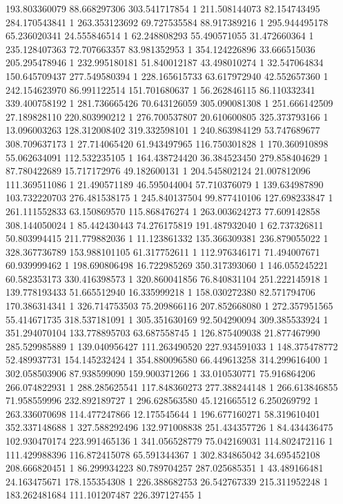 193.803360079	88.668297306	303.541717854	1
211.508144073	82.154743495	284.170543841	1
263.353123692	69.727535584	88.917389216	1
295.944495178	65.236020341	24.555846514	1
62.248808293	55.490571055	31.472660364	1
235.128407363	72.707663357	83.981352953	1
354.124226896	33.666515036	205.295478946	1
232.995180181	51.840012187	43.498010274	1
32.547064834	150.645709437	277.549580394	1
228.165615733	63.617972940	42.552657360	1
242.154623970	86.991122514	151.701680637	1
56.262846115	86.110332341	339.400758192	1
281.736665426	70.643126059	305.090081308	1
251.666142509	27.189828110	220.803990212	1
276.700537807	20.610600805	325.373793166	1
13.096003263	128.312008402	319.332598101	1
240.863984129	53.747689677	308.709637173	1
27.714065420	61.943497965	116.750301828	1
170.360910898	55.062634091	112.532235105	1
164.438724420	36.384523450	279.858404629	1
87.780422689	15.717172976	49.182600131	1
204.545802124	21.007812096	111.369511086	1
21.490571189	46.595044004	57.710376079	1
139.634987890	103.732220703	276.481538175	1
245.840137504	99.877410106	127.698233847	1
261.111552833	63.150869570	115.868476274	1
263.003624273	77.609142858	308.144050024	1
85.442430443	74.276175819	191.487932040	1
62.737326811	50.803994415	211.779882036	1
11.123861332	135.366309381	236.879055022	1
328.367736789	153.988101105	61.317752611	1
112.976346171	71.494007671	60.939999462	1
198.690806498	16.722985269	350.317393060	1
146.055245221	60.582353173	330.416398573	1
320.860041856	76.840831104	251.222145918	1
139.778193433	51.665512940	16.335999218	1
158.030272380	82.571794706	170.386314341	1
326.714753503	75.209866116	207.852668080	1
272.357951565	55.414671735	318.537181091	1
305.351630169	92.504290094	309.385533924	1
351.294070104	133.778895703	63.687558745	1
126.875409038	21.877467990	285.529985889	1
139.040956427	111.263490520	227.934591033	1
148.375478772	52.489937731	154.145232424	1
354.880096580	66.449613258	314.299616400	1
302.058503906	87.938599090	159.900371266	1
33.010530771	75.916864206	266.074822931	1
288.285625541	117.848360273	277.388244148	1
266.613846855	71.958559996	232.892189727	1
296.628563580	45.121665512	6.250269792	1
263.336070698	114.477247866	12.175545644	1
196.677160271	58.319610401	352.337148688	1
327.588292496	132.971008838	251.434357726	1
84.434436475	102.930470174	223.991465136	1
341.056528779	75.042169031	114.802472116	1
111.429988396	116.872415078	65.591344367	1
302.834865042	34.695452108	208.666820451	1
86.299934223	80.789704257	287.025685351	1
43.489166481	24.163475671	178.155354308	1
226.388682753	26.542767339	215.311952248	1
183.262481684	111.101207487	226.397127455	1
